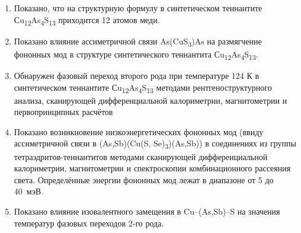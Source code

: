 \begin{enumerate}
						\item Показано, что на структурную формулу в синтетическом теннантите Сu\textsubscript{12}As\textsubscript{4}S\textsubscript{13} приходится 12 атомов меди.
						\item Показано влияние ассиметричной связи As(CuS\textsubscript{3})As на размягчение фононных мод в структуре синтетического теннантита Сu\textsubscript{12}As\textsubscript{4}S\textsubscript{13}.
						\item Обнаружен фазовый переход второго рода при температуре 124 К в синтетическом теннантите Сu\textsubscript{12}As\textsubscript{4}S\textsubscript{13} методами рентгеноструктурного анализа, сканирующей дифференциальной калориметрии, магнитометрии и первопринципных расчётов
						\item Показано возникновение низкоэнергетических фононных мод (ввиду  ассиметричной связи в (As,Sb)(Cu(S, Se)\textsubscript{3})(As,Sb)) в  соединениях из группы тетраэдритов-теннантитов методами сканирующей дифференциальной калориметрии, магнитометрии и спектроскопии комбинационного рассеяния света. Определённые энергии  фононных мод  лежат в диапазоне от 5 до 40~мэВ.
						\item Показано влияние изовалентного замещения в Cu--(As,Sb)--S на значения температур фазовых переходов 2-го рода.

\end{enumerate}
